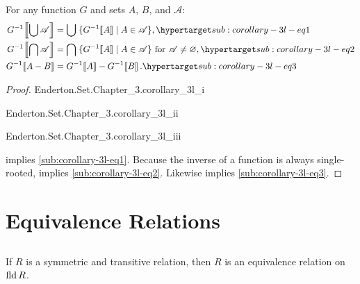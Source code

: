 \documentclass{report}
\begin{document}
\begin{theorem}[3L]

  For any function $G$ and sets $A$, $B$, and $\mathscr{A}$:
  \begin{align}
    \img{G^{-1}}{\bigcup{\mathscr{A}}}
      & = \bigcup\;\{\img{G^{-1}}{A} \mid A \in \mathscr{A}\},
      \hyperlabel{sub:corollary-3l-eq1} \\
    \img{G^{-1}}{\bigcap{\mathscr{A}}}
      & = \bigcap\;\{\img{G^{-1}}{A} \mid A \in \mathscr{A}\}
      \text{ for } \mathscr{A} \neq \emptyset,
      \hyperlabel{sub:corollary-3l-eq2} \\
    \img{G^{-1}}{A - B} & = \img{G^{-1}}{A} - \img{G^{-1}}{B}.
      \hyperlabel{sub:corollary-3l-eq3}
  \end{align}

\end{theorem}

\begin{proof}

  \statementpadding

    {Enderton.Set.Chapter\_3.corollary\_3l\_i}

    {Enderton.Set.Chapter\_3.corollary\_3l\_ii}

    {Enderton.Set.Chapter\_3.corollary\_3l\_iii}

   implies \eqref{sub:corollary-3l-eq1}.
  Because the inverse of a function is always single-rooted,
     implies \eqref{sub:corollary-3l-eq2}.
  Likewise  implies \eqref{sub:corollary-3l-eq3}.

\end{proof}

\section{Equivalence Relations}%

\subsection{}%

\begin{theorem}[3M]

  If $R$ is a symmetric and transitive relation, then $R$ is an equivalence
    relation on $\mathop{\text{fld}}{R}$.

\end{theorem}
\end{document}
